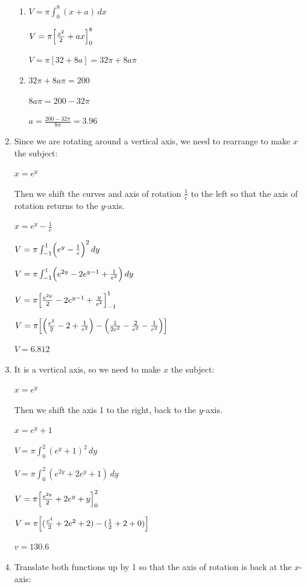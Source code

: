 \documentclass[../main.tex]{subfiles}
\begin{document}
\begin{spacing}{1.5}
\begin{enumerate}[itemsep=0.7cm]
    \begin{enumerate}
        \item 
        $V=\pi \int_0^8 (x+a)\,dx$

        $V=\pi \Bigl[\frac{x^2}{2}+ax\Bigr]_0^8$

        $V=\pi[32+8a]=32\pi+8a\pi$

        \item 
        $32\pi + 8a\pi=200$

        $8a\pi=200-32\pi$

        $a=\frac{200-32\pi}{8\pi}=3.96$

    \end{enumerate}
    
    \item 
    Since we are rotating around a vertical axis, we need to rearrange to make $x$ the subject:

    $x=e^y$

    Then we shift the curves and axis of rotation $\frac{1}{e}$ to the left so that the axis of rotation returns to the $y$-axis.

    $x=e^y-\frac{1}{e}$

    $V=\pi \int_{-1}^1 \Bigl(e^y -\frac{1}{e}\Bigr)^2\,dy$

    $V=\pi \int_{-1}^1 \Bigl(e^{2y}-2e^{y-1}+\frac{1}{e^2}\Bigr)\,dy$

    $V=\pi \Bigl[\frac{e^{2y}}{2}-2e^{y-1}+\frac{y}{e^2}\Bigr]_{-1}^1$

    $V=\pi \Bigl[\Bigl(\frac{e^2}{2}-2+\frac{1}{e^2}\Bigr)-\Bigl(\frac{1}{2e^2}-\frac{2}{e^2}-\frac{1}{e^2}\Bigr)\Bigr]$

    $V=6.812$

    \item 
    It is a vertical axis, so we need to make $x$ the subject:

    $x=e^y$

    Then we shift the axis 1 to the right, back to the $y$-axis.

    $x=e^y+1$

    $V=\pi \int_0^2 (e^y +1)^2\,dy$

    $V=\pi \int_0^2 (e^{2y}+2e^y+1)\,dy$

    $V=\pi \Bigl[\frac{e^{2y}}{2}+2e^y+y\Bigr]_0^2$

    $V=\pi \Bigl[(\frac{e^4}{2}+2e^2+2)-(\frac{1}{2}+2+0)\Bigr]$

    $v=130.6$

    \item 
    Translate both functions up by 1 so that the axis of rotation is back at the $x$-axis:


\end{enumerate}
\end{spacing}
\end{document}
